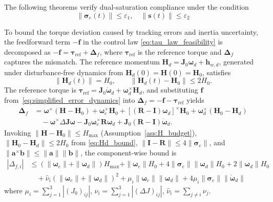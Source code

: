 \documentclass[journal]{new-aiaa}
\begin{document}
The following theorems verify dual-saturation compliance under the condition
\begin{equation}
\|\boldsymbol{\sigma}_e(t)\|\le \varepsilon_1, \quad \|\boldsymbol{s}(t)\|\le \varepsilon_2
\label{eq:error_bounds_condition}
\end{equation}

To bound the torque deviation caused by tracking errors and inertia uncertainty, the feedforward term $-\boldsymbol{f}$ in the control law \eqref{eq:tau_law_feasibility} is decomposed as $-\boldsymbol{f} = \boldsymbol{\tau}_{\mathrm{ref}} + \boldsymbol{\Delta}_f$, where $\boldsymbol{\tau}_{\mathrm{ref}}$ is the reference torque and $\boldsymbol{\Delta}_f$ captures the mismatch.
The reference momentum $\boldsymbol{H}_d = \boldsymbol{J}_0\boldsymbol{\omega}_d + \boldsymbol{h}_{w,d}$, generated under disturbance-free dynamics from $\boldsymbol{H}_d(0)=\boldsymbol{H}(0)=\boldsymbol{H}_0$, satisfies
\begin{equation}
\|\boldsymbol{H}_d(t)\| = H_0, \qquad \|\boldsymbol{H}_d(t)-\boldsymbol{H}_0\| \le 2H_0 .
\label{eq:Hd_bound}
\end{equation}
The reference torque is $\boldsymbol{\tau}_{\mathrm{ref}} = \boldsymbol{J}_0\dot{\boldsymbol{\omega}}_d + \boldsymbol{\omega}_d^{\times}\boldsymbol{H}_d$, and substituting $\boldsymbol{f}$ from~\eqref{eq:simplified_error_dynamics} into $\boldsymbol{\Delta}_f = -\boldsymbol{f} - \boldsymbol{\tau}_{\mathrm{ref}}$ yields
\begin{align}
\boldsymbol{\Delta}_f
&= \boldsymbol{\omega}^{\times}(\boldsymbol{H}-\boldsymbol{H}_0)
+ \boldsymbol{\omega}_e^{\times}\boldsymbol{H}_0
+ [(\boldsymbol{R}-\boldsymbol{I})\boldsymbol{\omega}_d]^{\times}\boldsymbol{H}_0
+ \boldsymbol{\omega}_d^{\times}(\boldsymbol{H}_0-\boldsymbol{H}_d) \nonumber \\
&\quad - \boldsymbol{\omega}^{\times}\Delta\boldsymbol{J}\boldsymbol{\omega}
- \boldsymbol{J}_0\boldsymbol{\omega}_e^{\times}\boldsymbol{R}\boldsymbol{\omega}_d
+ \boldsymbol{J}_0(\boldsymbol{R}-\boldsymbol{I})\dot{\boldsymbol{\omega}}_d .
\end{align}
Invoking $\|\boldsymbol{H}-\boldsymbol{H}_0\|\le H_{\max}$ (Assumption~\ref{ass:H_budget}),
$\|\boldsymbol{H}_0-\boldsymbol{H}_d\|\le 2H_0$ from \eqref{eq:Hd_bound},
$\|\boldsymbol{I}-\boldsymbol{R}\|\le 4\|\boldsymbol{\sigma}_e\|$,
and $\|\boldsymbol{a}^{\times}\boldsymbol{b}\|\le\|\boldsymbol{a}\|\|\boldsymbol{b}\|$,
the component-wise bound is
\begin{align}
|\Delta_{f,i}|
&\le (\|\boldsymbol{\omega}_e\|+\|\boldsymbol{\omega}_d\|)H_{\max}
+ \|\boldsymbol{\omega}_e\|H_0
+ 4\|\boldsymbol{\sigma}_e\|\|\boldsymbol{\omega}_d\|H_0
+ 2\|\boldsymbol{\omega}_d\|H_0 \nonumber \\
&\quad + \hat\nu_i(\|\boldsymbol{\omega}_e\|+\|\boldsymbol{\omega}_d\|)^2
+ \mu_i\|\boldsymbol{\omega}_e\|\|\boldsymbol{\omega}_d\|
+ 4\mu_i\|\boldsymbol{\sigma}_e\|\|\dot{\boldsymbol{\omega}}_d\|
\label{eq:Deltaf_bound}
\end{align}
where $\mu_i=\sum_{j=1}^{3}|(J_0)_{ij}|$, $\nu_i=\sum_{j=1}^{3}|(\Delta J)_{ij}|$, $\hat\nu_i=\sum_{j\ne i}\nu_j$.
\end{document}
